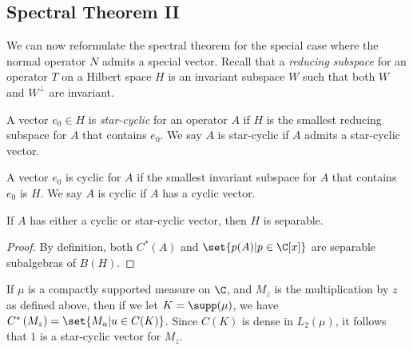 \documentclass[10pt]{mypackage}
\begin{document}
\subsection{Spectral Theorem II}%
We can now reformulate the spectral theorem for the special case where the normal operator $N$ admits a special vector. Recall that a \textit{reducing subspace} for an operator $T$ on a Hilbert space $H$ is an invariant subspace $W$ such that both $W$ and $W^{\perp}$ are invariant.
\begin{definition}
  A vector $e_0\in H$ is \textit{star-cyclic} for an operator $A$ if $H$ is the smallest reducing subspace for $A$ that contains $e_0$. We say $A$ is star-cyclic if $A$ admits a star-cyclic vector.

  A vector $e_0$ is cyclic for $A$ if the smallest invariant subspace for $A$ that contains $e_0$ is $H$. We say $A$ is cyclic if $A$ has a cyclic vector.
\end{definition}
\begin{proposition}
  If $A$ has either a cyclic or star-cyclic vector, then $H$ is separable.
\end{proposition}
\begin{proof}
  By definition, both $C^{\ast}(A)$ and $\set{p(A) | p\in \C[x]}$ are separable subalgebras of $B(H)$.
\end{proof}
If $\mu$ is a compactly supported measure on $\C$, and $M_z$ is the multiplication by $z$ as defined above, then if we let $K = \supp(\mu)$, we have $C^{\ast}\left( M_z \right) = \set{M_{u} | u\in C(K)}$. Since $C(K)$ is dense in $L_2\left( \mu \right)$, it follows that $1$ is a star-cyclic vector for $M_z$.
\end{document}

